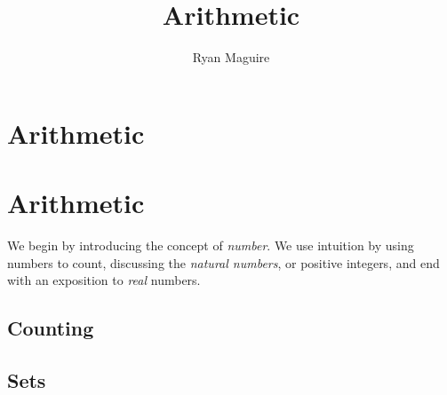 \documentclass[crop=false,class=book,oneside]{standalone}
\begin{document}
    \ifx\ifmain\undefined
        \title{Arithmetic}
        \author{Ryan Maguire}
        \date{\vspace{-5ex}}
        \maketitle
        \tableofcontents
        \chapter*{Arithmetic}
        \setcounter{chapter}{1}
    \else
        \chapter{Arithmetic}
    \fi
    We begin by introducing the concept of \textit{number}. We use
    intuition by using numbers to count, discussing the
    \textit{natural numbers}, or positive integers, and end
    with an exposition to \textit{real} numbers.
    \section{Counting}
    \section{Sets}
\end{document}

